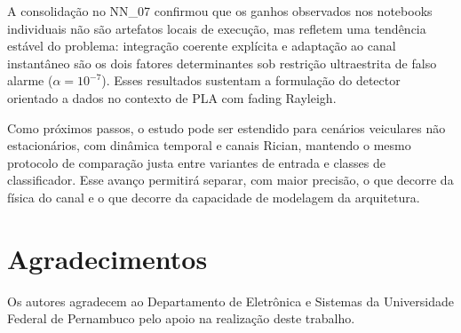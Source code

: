 \documentclass[12pt,a4paper]{article}
\begin{document}
A consolidação no NN\_07 confirmou que os ganhos observados nos notebooks individuais não são artefatos locais de execução, mas refletem uma tendência estável do problema: integração coerente explícita e adaptação ao canal instantâneo são os dois fatores determinantes sob restrição ultraestrita de falso alarme ($\alpha=10^{-7}$). Esses resultados sustentam a formulação do detector orientado a dados no contexto de PLA com fading Rayleigh.

Como próximos passos, o estudo pode ser estendido para cenários veiculares não estacionários, com dinâmica temporal e canais Rician, mantendo o mesmo protocolo de comparação justa entre variantes de entrada e classes de classificador. Esse avanço permitirá separar, com maior precisão, o que decorre da física do canal e o que decorre da capacidade de modelagem da arquitetura.

\section*{Agradecimentos}
Os autores agradecem ao Departamento de Eletrônica e Sistemas da Universidade Federal de Pernambuco pelo apoio na realização deste trabalho.
\end{document}
